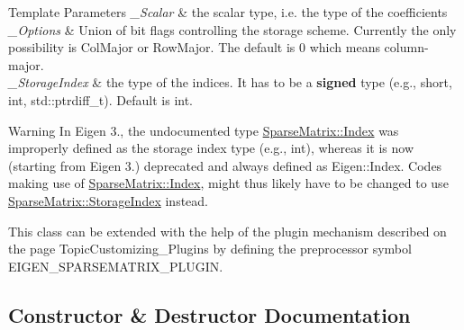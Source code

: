 \begin{DoxyTemplParams}{Template Parameters}
{\em \+\_\+\+Scalar} & the scalar type, i.\+e. the type of the coefficients \\
\hline
{\em \+\_\+\+Options} & Union of bit flags controlling the storage scheme. Currently the only possibility is Col\+Major or Row\+Major. The default is 0 which means column-\/major. \\
\hline
{\em \+\_\+\+Storage\+Index} & the type of the indices. It has to be a {\bfseries{signed}} type (e.\+g., short, int, std\+::ptrdiff\+\_\+t). Default is {\ttfamily int}.\\
\hline
\end{DoxyTemplParams}
\begin{DoxyWarning}{Warning}
In Eigen 3., the undocumented type {\ttfamily \mbox{\hyperlink{struct_eigen_1_1_eigen_base_a554f30542cc2316add4b1ea0a492ff02}{Sparse\+Matrix\+::\+Index}}} was improperly defined as the storage index type (e.\+g., int), whereas it is now (starting from Eigen 3.) deprecated and always defined as Eigen\+::\+Index. Codes making use of {\ttfamily \mbox{\hyperlink{struct_eigen_1_1_eigen_base_a554f30542cc2316add4b1ea0a492ff02}{Sparse\+Matrix\+::\+Index}}}, might thus likely have to be changed to use {\ttfamily \mbox{\hyperlink{class_eigen_1_1_sparse_matrix_base_a0b540ba724726ebe953f8c0df06081ed}{Sparse\+Matrix\+::\+Storage\+Index}}} instead.
\end{DoxyWarning}
This class can be extended with the help of the plugin mechanism described on the page Topic\+Customizing\+\_\+\+Plugins by defining the preprocessor symbol {\ttfamily E\+I\+G\+E\+N\+\_\+\+S\+P\+A\+R\+S\+E\+M\+A\+T\+R\+I\+X\+\_\+\+P\+L\+U\+G\+IN}. 

\subsection{Constructor \& Destructor Documentation}
\mbox{\label{class_eigen_1_1_sparse_matrix_a68087ee333c9614ea28850ec52069079}} 
